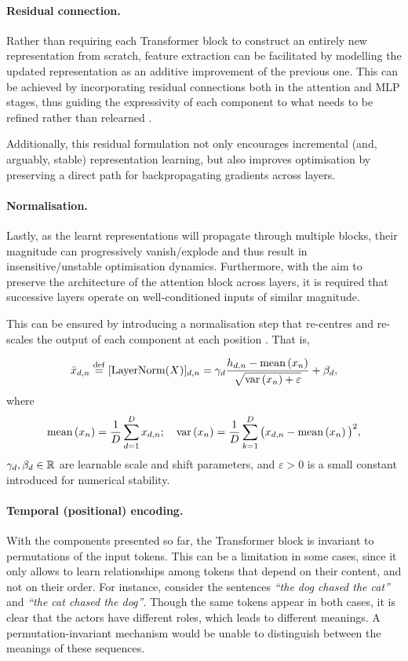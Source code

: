\paragraph{Residual connection.} Rather than requiring each Transformer block to construct an entirely new representation from scratch, feature extraction can be facilitated by modelling the updated representation as an additive improvement of the previous one. This can be achieved by incorporating residual connections both in the attention and MLP stages, thus guiding the expressivity of each component to what needs to be refined rather than relearned \cite{he2016deep}.

Additionally, this residual formulation not only encourages incremental (and, arguably, stable) representation learning, but also improves optimisation by preserving a direct path for backpropagating gradients across layers.

\paragraph{Normalisation.} Lastly, as the learnt representations will propagate through multiple blocks, their magnitude can progressively vanish/explode and thus result in insensitive/unstable optimisation dynamics. Furthermore, with the aim to preserve the architecture of the attention block across layers, it is required that successive layers operate on well-conditioned inputs of similar magnitude.

This can be ensured by introducing a normalisation step that re-centres and re-scales the output of each component at each position \cite{ba2016layer}. That is, 

\begin{equation}
    \bar{x}_{d,n} \mathrel{\stackrel{\mathrm{def}}{=}} [\mathrm{LayerNorm}(X)]_{d,n} = \gamma_d \frac{h_{d,n} - \text{mean} \left(x_n\right)}{\sqrt{\text{var} \left(x_n\right) + \varepsilon}} + \beta_d,
\end{equation}
where 
\[
\text{mean} \left(x_n\right) = \frac{1}{D}\sum_{d=1}^{D} x_{d,n}; \quad \text{var} \left(x_n\right) = \frac{1}{D}\sum_{k=1}^{D} \big(x_{d,n} - \text{mean} \left(x_{n}\right)\big)^2,
\]
$\gamma_d, \beta_d \in {\mathbb R}$ are learnable scale and shift parameters, and $\varepsilon > 0$ is a small constant introduced for numerical
stability.


\paragraph{Temporal (positional) encoding.}


With the components presented so far, the Transformer block is invariant to permutations of the input tokens. This can be a limitation in some cases, since it only allows to learn relationships among tokens that depend on their content, and not on their order. For instance, consider the sentences \emph{``the dog chased the cat''} and \emph{``the cat chased the dog''}.
Though the same tokens appear in both cases, it is clear that the actors have different roles, which leads to different meanings. A permutation-invariant mechanism would be unable to distinguish between the meanings of these sequences.

